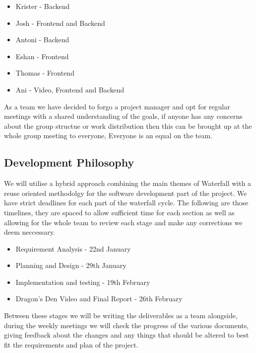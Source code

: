 \documentclass{article}
\begin{document}
\begin{itemize}
  \item Krister - Backend 
  \item Josh - Frontend and Backend 
  \item Antoni - Backend 
  \item Eshan -  Frontend
  \item Thomas - Frontend
  \item Ani - Video, Frontend and Backend
\end{itemize}

As a team we have decided to forgo a project manager and opt for regular meetings 
with a shared understanding of the goals, if anyone has any concerns about the group 
structue or work distribution then this can be brought up at the whole group meeting 
to everyone, Everyone is an equal on the team.

\subsection{Development Philosophy}
We will utilise a hybrid approach combining the main themes of Waterfall with a 
reuse oriented methodolgy for the software development part of the project. We 
have strict deadlines for each part of the waterfall cycle. The following are 
those timelines, they are spaced to allow sufficient time for each section as 
well as allowing for the whole team to review each stage and make any corrections 
we deem neccessary. 

\begin{itemize}
  \item Requirement Analysis
        - 22nd January
  \item Planning and Design
        - 29th January
  \item Implementation and testing
        - 19th February
  \item Dragon's Den Video and Final Report
        - 26th February
\end{itemize}

Between these stages we will be writing the deliverables as a team alongside,
during the weekly meetings we will check the progress of the various documents,
giving feedback about the changes and any things that should be altered to best 
fit the requirements and plan of the project.
\end{document}
